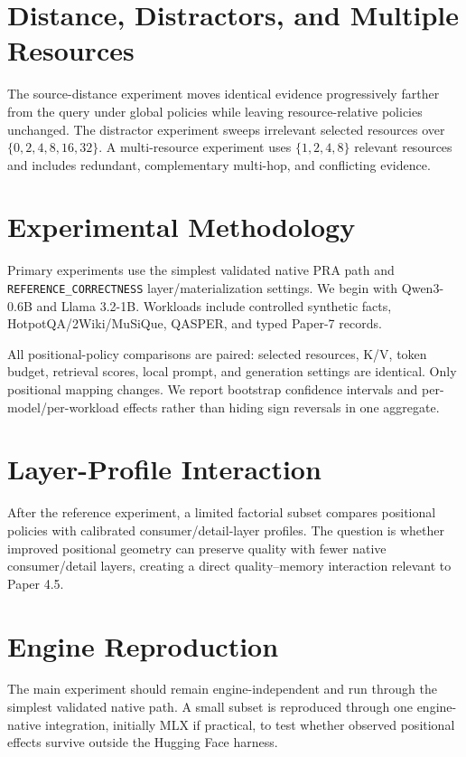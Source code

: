 \documentclass[10pt]{article}
\begin{document}
\section{Distance, Distractors, and Multiple Resources}
The source-distance experiment moves identical evidence progressively farther from the query under global policies while leaving resource-relative policies unchanged. The distractor experiment sweeps irrelevant selected resources over $\{0,2,4,8,16,32\}$. A multi-resource experiment uses $\{1,2,4,8\}$ relevant resources and includes redundant, complementary multi-hop, and conflicting evidence.

\section{Experimental Methodology}
Primary experiments use the simplest validated native PRA path and \texttt{REFERENCE\_CORRECTNESS} layer/materialization settings. We begin with Qwen3-0.6B and Llama 3.2-1B. Workloads include controlled synthetic facts, HotpotQA/2Wiki/MuSiQue, QASPER, and typed Paper-7 records.

All positional-policy comparisons are paired: selected resources, K/V, token budget, retrieval scores, local prompt, and generation settings are identical. Only positional mapping changes. We report bootstrap confidence intervals and per-model/per-workload effects rather than hiding sign reversals in one aggregate.

\section{Layer-Profile Interaction}
After the reference experiment, a limited factorial subset compares positional policies with calibrated consumer/detail-layer profiles. The question is whether improved positional geometry can preserve quality with fewer native consumer/detail layers, creating a direct quality--memory interaction relevant to Paper 4.5.

\section{Engine Reproduction}
The main experiment should remain engine-independent and run through the simplest validated native path. A small subset is reproduced through one engine-native integration, initially MLX if practical, to test whether observed positional effects survive outside the Hugging Face harness.
\end{document}
